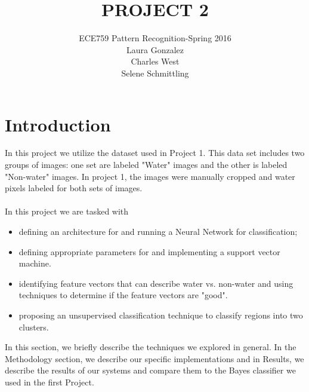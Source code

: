 \documentclass[12pt]{article}
\begin{document}
 
 
\title{PROJECT 2}%
\author{ECE759 Pattern Recognition-Spring 2016\\ %
Laura Gonzalez\\Charles West\\Selene Schmittling\\} %
 
\maketitle

\section{Introduction}

In this project we utilize the dataset used in Project 1.  This data set includes two groups of images: one set are labeled "Water" images and the other is labeled "Non-water" images. In project 1, the images were manually cropped and water pixels labeled for both sets of images. \\
\\
In this project we are tasked with
\begin{itemize}
	\item defining an architecture for and running a Neural Network for classification;
	\item defining appropriate parameters for and implementing a support vector machine.
	\item identifying feature vectors that can describe water vs. non-water and using techniques to determine if the feature vectors are "good".
	\item proposing an unsupervised classification technique to classify regions into two clusters.
\end{itemize}
In this section, we briefly describe the techniques we explored in general. In the Methodology section, we describe our specific implementations and in Results, we describe the results of our systems and compare them to the Bayes classifier we used in the first Project. 
\end{document}
